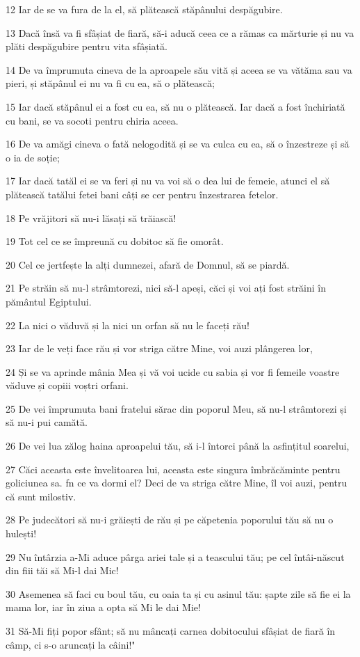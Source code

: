 \par 12 Iar de se va fura de la el, să plătească stăpânului despăgubire.
\par 13 Dacă însă va fi sfâșiat de fiară, să-i aducă ceea ce a rămas ca mărturie și nu va plăti despăgubire pentru vita sfâșiată.
\par 14 De va împrumuta cineva de la aproapele său vită și aceea se va vătăma sau va pieri, și stăpânul ei nu va fi cu ea, să o plătească;
\par 15 Iar dacă stăpânul ei a fost cu ea, să nu o plătească. Iar dacă a fost închiriată cu bani, se va socoti pentru chiria aceea.
\par 16 De va amăgi cineva o fată nelogodită și se va culca cu ea, să o înzestreze și să o ia de soție;
\par 17 Iar dacă tatăl ei se va feri și nu va voi să o dea lui de femeie, atunci el să plătească tatălui fetei bani câți se cer pentru înzestrarea fetelor.
\par 18 Pe vrăjitori să nu-i lăsați să trăiască!
\par 19 Tot cel ce se împreună cu dobitoc să fie omorât.
\par 20 Cel ce jertfește la alți dumnezei, afară de Domnul, să se piardă.
\par 21 Pe străin să nu-l strâmtorezi, nici să-l apeși, căci și voi ați fost străini în pământul Egiptului.
\par 22 La nici o văduvă și la nici un orfan să nu le faceți rău!
\par 23 Iar de le veți face rău și vor striga către Mine, voi auzi plângerea lor,
\par 24 Și se va aprinde mânia Mea și vă voi ucide cu sabia și vor fi femeile voastre văduve și copiii voștri orfani.
\par 25 De vei împrumuta bani fratelui sărac din poporul Meu, să nu-l strâmtorezi și să nu-i pui camătă.
\par 26 De vei lua zălog haina aproapelui tău, să i-l întorci până la asfințitul soarelui,
\par 27 Căci aceasta este învelitoarea lui, aceasta este singura îmbrăcăminte pentru goliciunea sa. fn ce va dormi el? Deci de va striga către Mine, îl voi auzi, pentru că sunt milostiv.
\par 28 Pe judecători să nu-i grăiești de rău și pe căpetenia poporului tău să nu o hulești!
\par 29 Nu întârzia a-Mi aduce pârga ariei tale și a teascului tău; pe cel întâi-născut din fiii tăi să Mi-l dai Mic!
\par 30 Asemenea să faci cu boul tău, cu oaia ta și cu asinul tău: șapte zile să fie ei la mama lor, iar în ziua a opta să Mi le dai Mie!
\par 31 Să-Mi fiți popor sfânt; să nu mâncați carnea dobitocului sfâșiat de fiară în câmp, ci s-o aruncați la câini!"

